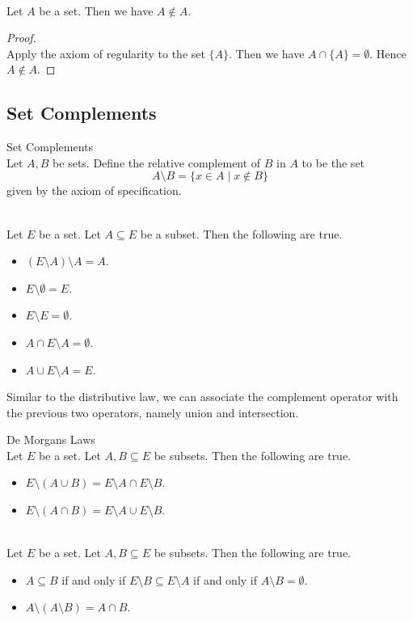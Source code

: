 \documentclass[a4paper]{article}
\begin{document}
\begin{prp}{}{}\\
Let $A$ be a set. Then we have $A\notin A$. 
\begin{proof}\\
Apply the axiom of regularity to the set $\{A\}$. Then we have $A\cap\{A\}=\emptyset$. Hence $A\notin A$. 
\end{proof}
\end{prp}

\subsection{Set Complements}
\begin{defn}{Set Complements}{}\\
Let $A,B$ be sets. Define the relative complement of $B$ in $A$ to be the set $$A\setminus B=\{x\in A\;|\;x\notin B\}$$ given by the axiom of specification. 
\end{defn}

\begin{prp}{}{}\\
Let $E$ be a set. Let $A\subseteq E$ be a subset. Then the following are true. 
\begin{itemize}
\item $(E\setminus A)\setminus A=A$. 
\item $E\setminus\emptyset=E$. 
\item $E\setminus E=\emptyset$. 
\item $A\cap E\setminus A=\emptyset$. 
\item $A\cup E\setminus A=E$. 
\end{itemize}
\end{prp}

Similar to the distributive law, we can associate the complement operator with the previous two operators, namely union and intersection. 

\begin{prp}{De Morgans Laws}{}\\
Let $E$ be a set. Let $A,B\subseteq E$ be subsets. Then the following are true. 
\begin{itemize}
\item $E\setminus(A\cup B)=E\setminus A\cap E\setminus B$. 
\item $E\setminus(A\cap B)=E\setminus A\cup E\setminus B$. 
\end{itemize}
\end{prp}

\begin{prp}{}{}\\
Let $E$ be a set. Let $A,B\subseteq E$ be subsets. Then the following are true. 
\begin{itemize}
\item $A\subseteq B$ if and only if $E\setminus B\subseteq E\setminus A$ if and only if $A\setminus B=\emptyset$. 
\item $A\setminus(A\setminus B)=A\cap B$. 
\end{itemize}
\end{prp}
\end{document}
